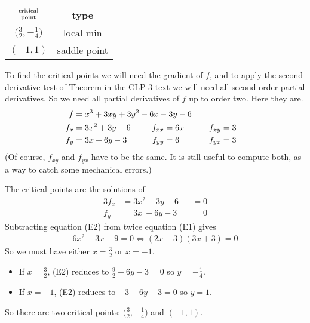 \begin{answer}
\begin{center}
\renewcommand{\arraystretch}{1.3}
     \begin{tabular}{|c|c|}
     \hline
    $\Atop{\text{critical}}{\text{point}}$   & type \\    
    \hline
     $\big(\frac{3}{2},-\frac{1}{4}\big)$  & local min  \\ \hline
     $(-1,1)$  &  saddle point \\  \hline
     \end{tabular}
\renewcommand{\arraystretch}{1.0}
\end{center}
\end{answer}

\begin{solution}
To find the critical points we will need the
gradient of $f$, and to apply the second derivative test of 
Theorem  in the CLP-3 text 
we will need all 
second order partial derivatives. So we need all partial derivatives of
$f$ up to order two.
Here they are.
\begin{alignat*}{3}
f&=x^3+3xy+3y^2-6x-3y-6 \hidewidth\\
f_x&=3x^2+3y-6   & f_{xx}&=6x \qquad & f_{xy}&= 3\\
f_y&=3x+6y-3 \qquad & f_{yy}&=6\qquad & f_{yx}&= 3
\end{alignat*}
(Of course, $f_{xy}$ and $f_{yx}$ have to be the same. It is still
useful to compute both, as a way to catch some mechanical errors.)

The critical points are the solutions of
\begin{alignat*}{3}
f_x&=3x^2+3y-6&&=0  \tag{E1} \\
f_y&=3x\ +6y-3 &&= 0  \tag{E2}
\end{alignat*}
Subtracting equation (E2) from twice equation (E1) gives
\begin{align*}
6x^2-3x-9=0
\iff (2x-3)(3x+3)=0
\end{align*}
So we must have either $x=\frac{3}{2}$ or $x=-1$.
\begin{itemize}
\item 
If $x=\frac{3}{2}$, (E2) reduces to $\frac{9}{2}+6y-3=0$ so $y=-\frac{1}{4}$.
\item 
If $x=-1$, (E2) reduces to $-3+6y-3=0$ so $y=1$.
\end{itemize}
So there are two critical points: $\big(\frac{3}{2},-\frac{1}{4}\big)$ and
$(-1,1)$.



\end{solution}
